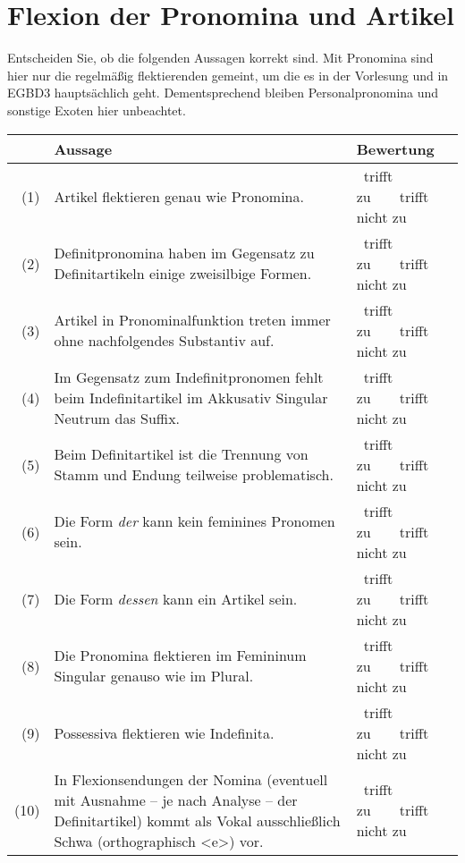 \section{Flexion der Pronomina und Artikel}

Entscheiden Sie, ob die folgenden Aussagen korrekt sind.
Mit Pronomina sind hier nur die regelmäßig flektierenden gemeint, um die es in der Vorlesung und in EGBD3 hauptsächlich geht.
Dementsprechend bleiben Personalpronomina und sonstige Exoten hier unbeachtet.

\begin{center}
  \renewcommand{\arraystretch}{1.5}
  \begin{tabular}[h]{rp{}l}
    \toprule
    & \textbf{Aussage} & \textbf{Bewertung} \\ 
    \midrule
    (1) & Artikel flektieren genau wie Pronomina. & \Solalt{\Square}{\Square}~trifft zu\ \ \ \Solalt{\XBox}{\Square}~trifft nicht zu \\
    (2) & Definitpronomina haben im Gegensatz zu Definitartikeln einige zweisilbige Formen. & \Solalt{\XBox}{\Square}~trifft zu\ \ \ \Solalt{\Square}{\Square}~trifft nicht zu \\
    (3) & Artikel in Pronominalfunktion treten immer ohne nachfolgendes Substantiv auf. & \Solalt{\Square}{\Square}~trifft zu\ \ \ \Solalt{\XBox}{\Square}~trifft nicht zu \\
    (4) & Im Gegensatz zum Indefinitpronomen fehlt beim Indefinitartikel im Akkusativ Singular Neutrum das Suffix. & \Solalt{\XBox}{\Square}~trifft zu\ \ \ \Solalt{\Square}{\Square}~trifft nicht zu \\
    (5) & Beim Definitartikel ist die Trennung von Stamm und Endung teilweise problematisch. & \Solalt{\XBox}{\Square}~trifft zu\ \ \ \Solalt{\Square}{\Square}~trifft nicht zu \\
    (6) & Die Form \textit{der} kann kein feminines Pronomen sein. & \Solalt{\Square}{\Square}~trifft zu\ \ \ \Solalt{\XBox}{\Square}~trifft nicht zu \\
    (7) & Die Form \textit{dessen} kann ein Artikel sein. & \Solalt{\Square}{\Square}~trifft zu\ \ \ \Solalt{\XBox}{\Square}~trifft nicht zu \\
    (8) & Die Pronomina flektieren im Femininum Singular genauso wie im Plural. & \Solalt{\Square}{\Square}~trifft zu\ \ \ \Solalt{\XBox}{\Square}~trifft nicht zu \\
    (9) & Possessiva flektieren wie Indefinita. & \Solalt{\XBox}{\Square}~trifft zu\ \ \ \Solalt{\Square}{\Square}~trifft nicht zu \\
    (10) & In Flexionsendungen der Nomina (eventuell mit Ausnahme -- je nach Analyse -- der Definitartikel) kommt als Vokal ausschließlich Schwa (orthographisch <e>) vor. & \Solalt{\XBox}{\Square}~trifft zu\ \ \ \Solalt{\Square}{\Square}~trifft nicht zu \\
  \end{tabular}
\end{center}


